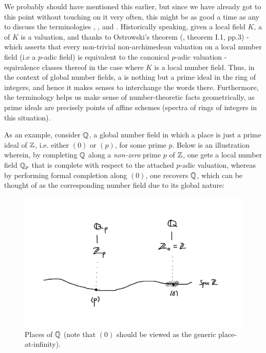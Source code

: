            \begin{convention} \label{conv: places_and_primes} 
                We probably should have mentioned this earlier, but since we have already got to this point without touching on it very often, this might be as good a time as any to discuss the terminologies , , and . Historically speaking, given a local field $K$, a  of $K$ is a valuation, and thanks to Ostrowski's theorem (\cite{koblitz_p_adic}, theorem I.1, pp.3) - which asserts that every non-trivial non-archimedean valuation on a local number field (i.e a $p$-adic field) is equivalent to the canonical $p$-adic valuation - equivalence classes thereof in the case where $K$ is a local number field. Thus, in the context of global number fields, a  is nothing but a prime ideal in the ring of integers, and hence it makes senses to interchange the words there. Furthermore, the terminology  helps us make sense of number-theoretic facts geometrically, as prime ideals are precisely points of affine schemes (spectra of rings of integers in this situation).
                
                As an example, consider $\mathbb{Q}$, a global number field in which a place is just a prime ideal of $\mathbb{Z}$, i.e. either $(0)$ or $(p)$, for some prime $p$. Below is an illustration wherein, by completing $\mathbb{Q}$ along a \textit{non-zero} prime $p$ of $\mathbb{Z}$, one gets a local number field $\mathbb{Q}_p$ that is complete with respect to the attached $p$-adic valuation, whereas by performing formal completion along $(0)$, one recovers $\mathbb{Q}$, which can be thought of as the corresponding  number field due to its global nature:
                    \begin{figure}[H]
                        \centering
                        \includegraphics[width=\linewidth,height=\textheight,keepaspectratio]{Figures/places of Spec Z.png}
                        \caption{Places of $\mathbb{Q}$ (note that $(0)$ should be viewed as the generic place-at-infinity).}
                        \label{fig: places_of_Q}
                    \end{figure}
            \end{convention}
            
